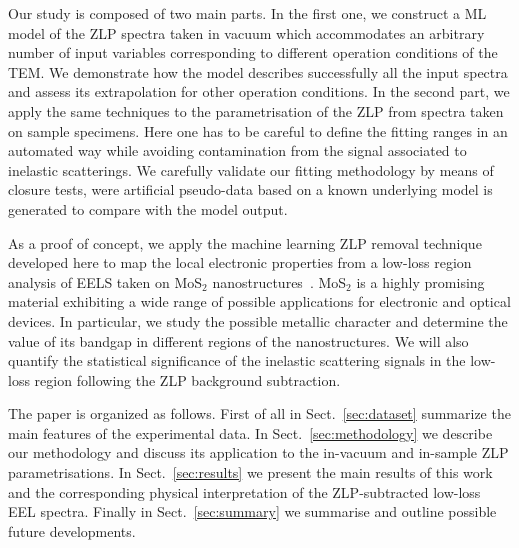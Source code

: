 Our study is composed of two main parts.
%
In the first one, we construct a ML model of the ZLP spectra taken
in vacuum which accommodates an  arbitrary number of input
variables corresponding to different operation conditions of the TEM.
%
We demonstrate how the model describes successfully all the
input spectra and assess its extrapolation for other operation
conditions.
%
In the second part, we apply the same techniques to
the parametrisation of the ZLP from spectra taken on sample specimens.
%
Here one has to be careful to define the fitting ranges
in an automated way while avoiding contamination from
the signal associated to inelastic scatterings.
%
We carefully validate our fitting methodology by means of closure tests, were
artificial pseudo-data based on a known underlying model is generated
to compare with the model output.

As a proof of concept, we apply the machine learning ZLP removal technique
developed here to map the local electronic properties
from a low-loss region analysis of EELS taken on
MoS$_2$ nanostructures~\cite{soniamos2}.
%
MoS$_2$ is a highly promising material exhibiting a wide range of possible applications for electronic and optical devices.
%
In particular, we study the possible metallic character and
determine the value of its
bandgap in different regions of the nanostructures.
%
We will also quantify the statistical significance of the inelastic
scattering signals in the low-loss region following the ZLP
background subtraction.

The paper is organized as follows.
%
First of all in Sect.~\ref{sec:dataset}
summarize the main features of the experimental data.
%
In Sect.~\ref{sec:methodology} we describe our methodology
and discuss its application to the in-vacuum and in-sample
ZLP parametrisations.
%
In Sect.~\ref{sec:results} we present the main results
of this work and the corresponding physical interpretation
of the ZLP-subtracted low-loss EEL spectra.
%
Finally in Sect.~\ref{sec:summary} we summarise
and outline possible future developments.
